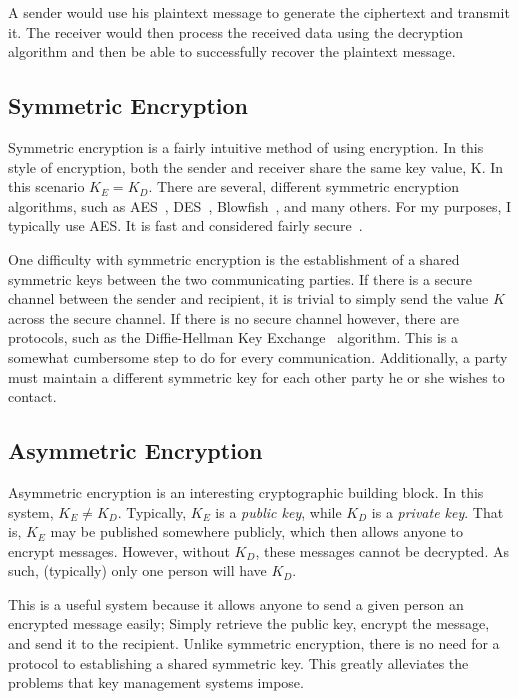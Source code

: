 A sender would use his plaintext message to generate the ciphertext and transmit it. The receiver would then process the received data using the decryption
algorithm and then be able to successfully recover the plaintext message.

\subsection{Symmetric Encryption}
Symmetric encryption is a fairly intuitive method of using encryption. In this style of encryption,
both the sender and receiver share the same key value, K. In this scenario $K_E = K_D$. There are several,
different symmetric encryption algorithms, such as AES~\cite{AES}, DES~\cite{DES}, Blowfish~\cite{Blowfish}, and many others.
For my purposes, I typically use AES. It is fast and considered fairly secure~\cite{aessecurity}.

One difficulty with symmetric encryption is the establishment of a shared symmetric keys between the two communicating parties.
If there is a secure channel between the sender and recipient, it is trivial to simply send the value $K$ across the secure channel.
If there is no secure channel however, there are protocols, such as the Diffie-Hellman Key Exchange~\cite{diffiehellmankeyexchange} algorithm.
This is a somewhat cumbersome step to do for every communication. Additionally, a party must maintain a different symmetric key for each
other party he or she wishes to contact.

\subsection{Asymmetric Encryption}
Asymmetric encryption is an interesting cryptographic building block. In this system, $K_E \neq K_D$. Typically,
$K_E$ is a \emph{public key}, while $K_D$ is a \emph{private key}. That is, $K_E$ may be published somewhere publicly,
which then allows anyone to encrypt messages. However, without $K_D$, these messages cannot be decrypted. As such, (typically) only one person
will have $K_D$. 

This is a useful system because it allows anyone to send a given person an encrypted message easily; Simply retrieve the public key,
encrypt the message, and send it to the recipient. Unlike symmetric encryption, there is no need for a protocol to establishing a shared symmetric
key. This greatly alleviates the problems that key management systems impose.

